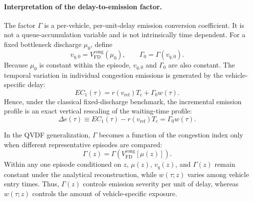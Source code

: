 \paragraph{Interpretation of the delay-to-emission factor.}
The factor $\Gamma$ is a per-vehicle, per-unit-delay emission conversion
coefficient. It is not a queue-accumulation variable and is not intrinsically
time dependent. For a fixed bottleneck discharge $\mu_0$, define
\begin{equation}
\label{eq:fixed_mu_vq_gamma}
v_{q,0}
=
V_{\mathrm{FD}}^{\mathrm{cong}}(\mu_0),
\qquad
\Gamma_0
=
\Gamma(v_{q,0}).
\end{equation}
Because $\mu_0$ is constant within the episode, $v_{q,0}$ and $\Gamma_0$ are
also constant. The temporal variation in individual congestion emissions is
generated by the vehicle-specific delay:
\begin{equation}
\label{eq:fixed_bottleneck_vehicle_emission}
EC_1(\tau)
=
r(v_{\mathrm{ref}})T_c
+
\Gamma_0 w(\tau).
\end{equation}
Hence, under the classical fixed-discharge benchmark, the incremental
emission profile is an exact vertical rescaling of the waiting-time profile:
\begin{equation}
\label{eq:fixed_bottleneck_incremental_emission}
\Delta e(\tau)
\equiv
EC_1(\tau)-r(v_{\mathrm{ref}})T_c
=
\Gamma_0 w(\tau).
\end{equation}

In the QVDF generalization, $\Gamma$ becomes a function of the congestion
index only when different representative episodes are compared:
\begin{equation}
\label{eq:gamma_as_z_function}
\Gamma(z)
=
\Gamma\!\left(
V_{\mathrm{FD}}^{\mathrm{cong}}[\mu(z)]
\right).
\end{equation}
Within any one episode conditioned on $z$, $\mu(z)$, $v_q(z)$, and
$\Gamma(z)$ remain constant under the analytical reconstruction, while
$w(\tau;z)$ varies among vehicle entry times. Thus, $\Gamma(z)$ controls
emission severity per unit of delay, whereas $w(\tau;z)$ controls the
amount of vehicle-specific exposure.



